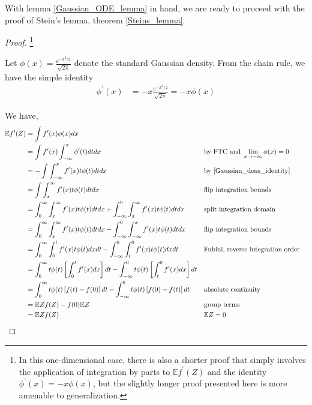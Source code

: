 \documentclass[12pt]{article}
\newcommand{\E}{\mathbb{E}}
\newcommand{\GaussianDens}{\phi}
\begin{document}
With lemma \ref{Gaussian_ODE_lemma} in hand, we are ready to proceed with the proof of Stein's lemma, theorem \ref{Steins_lemma}. 

\begin{proof} \footnote{In this one-dimensional case, there is also a shorter proof that simply involves the application 
				   of integration by parts to $\E f^\prime(Z)$ and the identity $\GaussianDens^\prime(x) = -x \GaussianDens(x)$, but the slightly
				   longer proof presented here is more amenable to generalization.}

Let $\GaussianDens(x) = \frac{e^{-x^2/2}}{\sqrt{2\pi}}$ denote the standard Gaussian density. From the chain rule, we have the simple identity 
\begin{align}
\GaussianDens^\prime(x) &= -x \frac{e^{-x^2/2}}{\sqrt{2\pi}} = -x \GaussianDens(x) \label{Gaussian_dens_identity}
\end{align}

We have, 
\begin{align*}
\E f^\prime(Z) 
&= \int f^\prime(x) \GaussianDens(x) dx \\
&= \int f^\prime(x) \int_{-\infty}^{x} \GaussianDens^\prime(t) dt dx &&\text{by FTC and } \lim_{x \to -\infty} \GaussianDens(x) = 0 \\
&= -\int \int_{-\infty}^{x} f^\prime(x) t \GaussianDens(t) dt dx 	   &&\text{by \ref{Gaussian_dens_identity}} \\
&= \int \int_{x}^{\infty} f^\prime(x) t \GaussianDens(t) dt dx		   &&\text{flip integration bounds} \\
&= \int_{0}^{\infty} \int_{x}^{\infty} f^\prime(x) t \GaussianDens(t) dt dx + \int_{-\infty}^{0} \int_{x}^{\infty} f^\prime(x) t \GaussianDens(t) dt dx &&\text{split integration domain} \\
&= \int_{0}^{\infty} \int_{x}^{\infty} f^\prime(x) t \GaussianDens(t) dt dx - \int_{-\infty}^{0} \int_{-\infty}^{x} f^\prime(x) t \GaussianDens(t) dt dx &&\text{flip integration bounds} \\
&= \int_{0}^{\infty} \int_{0}^{t} f^\prime(x) t \GaussianDens(t) dx dt - \int_{-\infty}^{0} \int_{t}^{0} f^\prime(x) t \GaussianDens(t) dx dt &&\text{Fubini, reverse integration order} \\
&= \int_{0}^{\infty} t \GaussianDens(t) \left[\int_{0}^{t} f^\prime(x) dx \right] dt - \int_{-\infty}^{0}  t \GaussianDens(t) \left[\int_{t}^{0} f^\prime(x)  dx\right] dt \\
&= \int_{0}^{\infty} t \GaussianDens(t) \left[f(t) - f(0) \right] dt - \int_{-\infty}^{0}  t \GaussianDens(t) \left[f(0) - f(t) \right] dt && \text{absolute continuity} \\
&= \E Z f(Z) - f(0) \E Z &&\text{group terms} \\
&= \E Z f(Z) &&\E Z = 0
\end{align*}


\end{proof}
\end{document}
